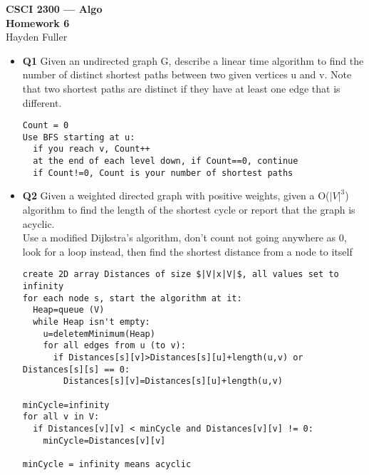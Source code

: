 \documentclass[11pt]{article}
\def\a{\alpha}
\def\b{\beta}
\def\g{\gamma}
\def\d{\delta}
\begin{document}
\thispagestyle{empty}   %


\begin{center}
\large
\textbf{CSCI 2300 --- Algo \\
Homework 6}
\\Hayden Fuller 
\end{center}

\begin{itemize}

\item \textbf{Q1} 
Given an undirected graph G, describe a linear time algorithm to find the number of distinct shortest paths between two given vertices u and v. Note that two shortest paths are distinct if they have at least one edge that is different.
\begin{verbatim}
Count = 0
Use BFS starting at u:
  if you reach v, Count++
  at the end of each level down, if Count==0, continue
  if Count!=0, Count is your number of shortest paths
\end{verbatim}

\vspace{0.1in}

\item \textbf{Q2} 
Given a weighted directed graph with positive weights, given a O($|V|^3$) algorithm to find the length of the shortest cycle or report that the graph is acyclic.
\\Use a modified Dijkstra's algorithm, don't count not going anywhere as 0, look for a loop instead, then find the shortest distance from a node to itself
\begin{verbatim}
create 2D array Distances of size $|V|x|V|$, all values set to infinity
for each node s, start the algorithm at it:
  Heap=queue (V)
  while Heap isn't empty:
    u=deletemMinimum(Heap)
    for all edges from u (to v):
      if Distances[s][v]>Distances[s][u]+length(u,v) or Distances[s][s] == 0:
        Distances[s][v]=Distances[s][u]+length(u,v)

minCycle=infinity
for all v in V:
  if Distances[v][v] < minCycle and Distances[v][v] != 0:
    minCycle=Distances[v][v]

minCycle = infinity means acyclic
\end{verbatim}

\vspace{0.1in}


\end{itemize}
\end{document}

